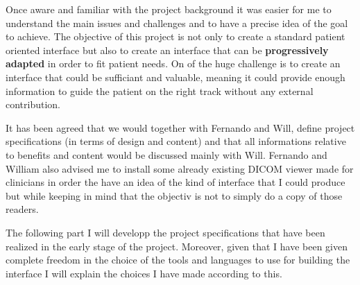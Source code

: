 Once aware and familiar with the project background it was easier for me to understand the main issues and challenges and to have a precise idea of the goal to achieve. The objective of this project is not only to create a standard patient oriented interface but also to create an interface that can be \textbf{progressively adapted} in order to fit patient needs. On of the huge challenge is to create an interface that could be sufficiant and valuable, meaning it could provide enough information to guide the patient on the right track without any external contribution. 

\newline \vspace{5mm}
It has been agreed that we would together with Fernando and Will, define project specifications (in terms of design and content) and that all informations relative to benefits and content would be discussed mainly with Will. Fernando and William also advised me to install some already existing DICOM viewer made for clinicians in order the have an idea of the kind of interface that I could produce but while keeping in mind that the objectiv is not to simply do a copy of those readers.

\newline \vspace{5mm}
The following part I will developp the project specifications that have been realized in the early stage of the project. Moreover, given that I have been given complete freedom in the choice of the tools and languages to use for building the interface I will explain the choices I have made according to this.



